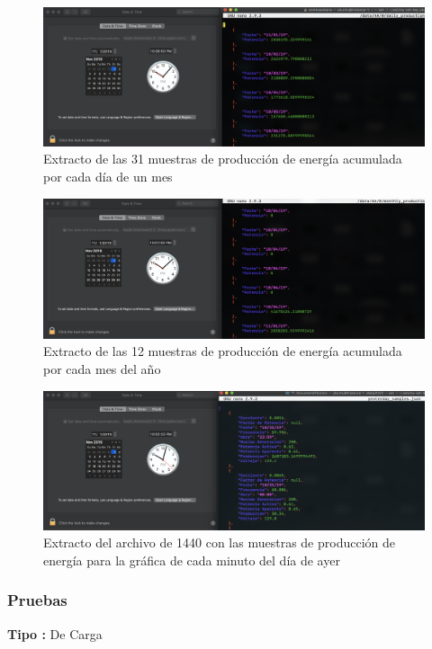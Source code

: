 \begin{figure}[H]
	\centering
	\includegraphics[scale=.3]{Capitulo5/images/daily.png}
	\caption{Extracto de las 31 muestras de producción de energía acumulada por cada día de un mes}
	\label{fig:}
\end{figure}

\begin{figure}[H]
	\centering
	\includegraphics[scale=.3]{Capitulo5/images/monthly.png}
	\caption{Extracto de las 12 muestras de producción de energía acumulada por cada mes del año}
	\label{fig:}
\end{figure} 


\begin{figure}[H]
	\centering
	\includegraphics[scale=.3]{Capitulo5/images/yesterday.png}
	\caption{Extracto del archivo de 1440 con las muestras de producción de energía para la gráfica de cada minuto del día de ayer}
	\label{fig:}
\end{figure} 

\subsubsection{Pruebas}
\textbf{Tipo :} De Carga
\\ \newline

